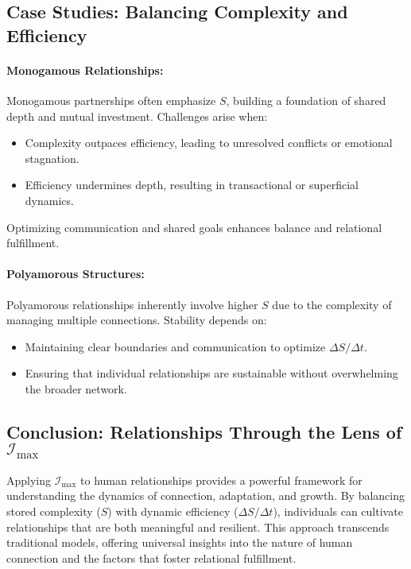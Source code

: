 \documentclass[12pt]{article}
\begin{document}
\subsection{Case Studies: Balancing Complexity and Efficiency}

\paragraph{Monogamous Relationships:}
Monogamous partnerships often emphasize \( S \), building a foundation of shared depth and mutual investment. Challenges arise when:
\begin{itemize}
    \item Complexity outpaces efficiency, leading to unresolved conflicts or emotional stagnation.
    \item Efficiency undermines depth, resulting in transactional or superficial dynamics.
\end{itemize}
Optimizing communication and shared goals enhances balance and relational fulfillment.

\paragraph{Polyamorous Structures:}
Polyamorous relationships inherently involve higher \( S \) due to the complexity of managing multiple connections. Stability depends on:
\begin{itemize}
    \item Maintaining clear boundaries and communication to optimize \( \Delta S / \Delta t \).
    \item Ensuring that individual relationships are sustainable without overwhelming the broader network.
\end{itemize}

\subsection{Conclusion: Relationships Through the Lens of \(\mathcal{I}_{\text{max}}\)}
Applying \(\mathcal{I}_{\text{max}}\) to human relationships provides a powerful framework for understanding the dynamics of connection, adaptation, and growth. By balancing stored complexity (\( S \)) with dynamic efficiency (\( \Delta S / \Delta t \)), individuals can cultivate relationships that are both meaningful and resilient. This approach transcends traditional models, offering universal insights into the nature of human connection and the factors that foster relational fulfillment.
\end{document}
